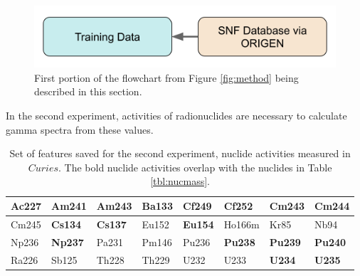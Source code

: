 \begin{figure}[H]
  \centering
  \includegraphics[width=0.7\linewidth]{./chapters/exp1/methodology1.png}
  \caption{First portion of the flowchart from Figure \ref{fig:method} being 
           described in this section.}
\end{figure}


In the second experiment, activities of radionuclides are necessary to
calculate gamma spectra from these values.

\begin{table}[!htb]
  \centering
  \begin{tabular}{@{}|l|l|l|l|l|l|l|l|@{}}
    \toprule
    Ac227&\textbf{Am241}&\textbf{Am243}&Ba133&Cf249          & Cf252          & Cm243          & \textbf{Cm244} \\ \midrule
    Cm245&\textbf{Cs134}&\textbf{Cs137}&Eu152&\textbf{Eu154} & Ho166m         & Kr85           & Nb94           \\ \midrule
    Np236&\textbf{Np237}&Pa231         &Pm146&Pu236          & \textbf{Pu238} & \textbf{Pu239} & \textbf{Pu240} \\ \midrule
    Ra226&Sb125         &Th228         &Th229&U232           & U233           & \textbf{U234}  & \textbf{U235}  \\ \bottomrule
  \end{tabular}
  \caption{Set of features saved for the second experiment, nuclide activities
           measured in $Curies$. The bold nuclide activities overlap with the 
           nuclides in Table \ref{tbl:nucmass}.}
  \label{tbl:nucacts}
\end{table}

